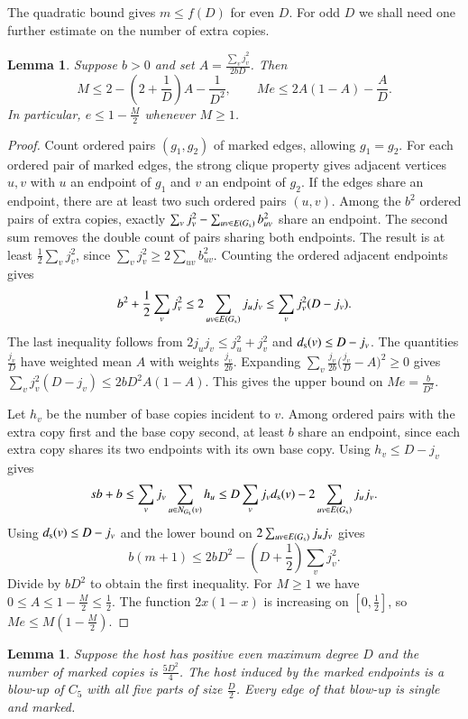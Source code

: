 \documentclass[preprint,11pt,numbers]{elsarticle-arxiv}
\numberwithin{equation}{section}
\newtheorem{lemma}[theorem]{Lemma}
\theoremstyle{definition}
\begin{document}
The quadratic bound gives $m\leq f(D)$ for even $D$. For odd $D$
we shall need one further estimate on the number of extra copies.

\begin{lemma}\label{lem:multi-extra}
Suppose $b>0$ and set $A=\frac{\sum_v j_v^2}{2bD}$. Then
\[
 M\le 2-\left(2+\frac{1}{D}\right)A-\frac{1}{D^2},
 \qquad
 Me\le 2A(1-A)-\frac{A}{D}.
\]
In particular, $e\le 1-\frac{M}{2}$ whenever $M\ge1$.
\end{lemma}

\begin{proof}
Count ordered pairs $(g_1,g_2)$ of marked edges, allowing $g_1=g_2$.
For each ordered pair of marked edges, the strong clique property gives adjacent vertices
$u,v$ with $u$ an endpoint of $g_1$ and $v$ an endpoint of $g_2$.
If the edges share an endpoint, there are at least two
such ordered pairs $(u,v)$. Among the $b^2$ ordered pairs of extra copies,
exactly $\sum_v j_v^2-\sum_{uv\in E(G_{\rm s})}b_{uv}^2$ share an
endpoint. The second sum removes the
double count of pairs sharing both endpoints. The result is at least
$\frac{1}{2}\sum_v j_v^2$, since $\sum_v j_v^2\ge2\sum_{uv}b_{uv}^2$.
Counting the ordered adjacent endpoints gives
\[
 b^2+\frac{1}{2}\sum_v j_v^2
 \le 2\sum_{uv\in E(G_{\rm s})}j_uj_v
 \le \sum_v j_v^2(D-j_v).
\]
The last inequality follows from $2j_uj_v\le j_u^2+j_v^2$ and
$d_{\rm s}(v)\le D-j_v$. The quantities $\frac{j_v}{D}$ have
weighted mean $A$ with weights $\frac{j_v}{2b}$. Expanding
$\sum_v \frac{j_v}{2b}\bigl(\frac{j_v}{D}-A\bigr)^2\geq0$
gives $\sum_v j_v^2(D-j_v)\le 2bD^2A(1-A)$.
This gives the upper bound on $Me=\frac{b}{D^2}$.

Let $h_v$ be the number of base copies incident to $v$. Among ordered pairs
with the extra copy first and the base copy second, at least
$b$ share an endpoint, since each extra copy shares its two
endpoints with its own base copy. Using $h_v\le D-j_v$ gives
\[
 sb+b\le \sum_v j_v\sum_{u\in N_{G_{\rm s}}(v)} h_u
 \le D\sum_v j_v d_{\rm s}(v)-2\sum_{uv\in E(G_{\rm s})}j_uj_v.
\]
Using $d_{\rm s}(v)\le D-j_v$ and the lower bound on
$2\sum_{uv\in E(G_{\rm s})}j_uj_v$ gives
\[
 b(m+1)\le 2bD^2-\left(D+\frac{1}{2}\right)\sum_v j_v^2.
\]
Divide by $bD^2$ to obtain the first inequality. For $M\ge1$ we
have $0\le A\le 1-\frac{M}{2}\le\frac{1}{2}$. The function $2x(1-x)$ is
increasing on $[0,\frac{1}{2}]$, so $Me\le M(1-\frac{M}{2})$.
\end{proof}

\begin{lemma}\label{lem:multi-even-equality}
Suppose the host has positive even maximum degree $D$ and the
number of marked copies is $\frac{5D^2}{4}$. The host induced by
the marked endpoints is a blow-up of $C_5$ with all five parts of
size $\frac{D}{2}$. Every edge of that blow-up is single and marked.
\end{lemma}
\end{document}
